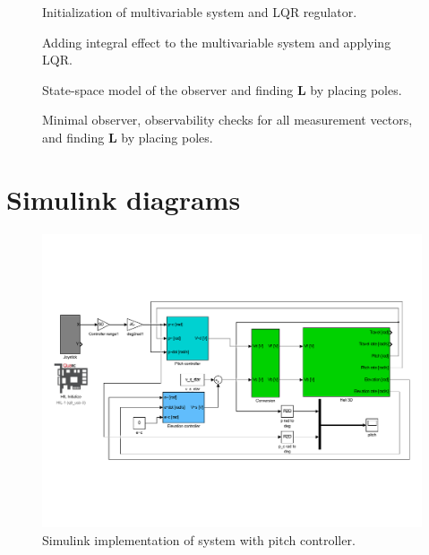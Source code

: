 \begin{figure}[!htb]
    \centering
    \caption{Initialization of multivariable system and LQR regulator.}
    
    \label{fig:P3p2}
\end{figure}

\begin{figure}[!htb]
    \centering
    \caption{Adding integral effect to the multivariable system and applying LQR.}
    
    \label{fig:P3p3}
\end{figure}

\begin{figure}[!htb]
    \centering
    \caption{State-space model of the observer and finding $\mathbf{L}$ by placing poles.}
    
    \label{fig:P4p2}
\end{figure}


\begin{figure}[!htb]
    \centering
    \caption{Minimal observer, observability checks for all measurement vectors, and finding $\mathbf{L}$ by placing poles.}
    
    \label{fig:P4p3}
\end{figure}


\clearpage
\section{Simulink diagrams}

\begin{figure}[!htb]
	\centering
	\includegraphics[trim=10 100 10 100, clip, width=\textwidth]{simulink/P2p1.pdf}
	\caption{Simulink implementation of system with pitch controller.}
\label{fig:monoPitch}
\end{figure}

